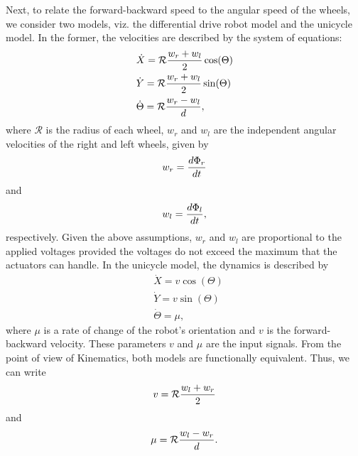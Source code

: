\documentclass[final,5p,times,twocolumn]{elsarticle}
\begin{document}
Next, to relate the forward-backward speed to the angular speed of the wheels, we consider two models, viz. the differential drive robot model and the unicycle model. In the former, the velocities are described by the system of equations:
\begin{equation}
\begin{split}
&\dot{X} = \mathcal{R}{w_r+w_l\over2}\cos(\Theta)\\
&\dot{Y} = \mathcal{R}{w_r+w_l\over2}\sin(\Theta)\\
&\dot{\Theta} = \mathcal{R}{w_r-w_l\over d},\label{ddrmodel}
\end{split}
\end{equation}
where $\mathcal{R}$ is the radius of each wheel, $w_{r}$ and $w_{l}$ are the independent angular velocities of the right and left wheels, given by
\begin{equation}
\begin{split}
w_{r} = {d\Phi_{r}\over dt}
\end{split}
\end{equation}
and 
\begin{equation}
\begin{split}
w_{l} = {d\Phi_{l}\over dt},
\end{split}
\end{equation}
respectively. Given the above assumptions, $w_{r}$ and $w_{l}$ are proportional to the applied voltages provided the voltages do not exceed the maximum that the actuators can handle. In the unicycle model, the dynamics is described by
\begin{equation}
\begin{split}
&\dot{X} = v\cos(\Theta)\\
&\dot{Y} = v\sin(\Theta)\\
&\dot{\Theta} = \mu,\label{unicycle}
\end{split}
\end{equation}
where $\mu$ is a rate of change of the robot's orientation and $v$ is the forward-backward velocity. These parameters $v$ and $\mu$ are the input signals.  From the point of view of Kinematics, both models are functionally equivalent. Thus, we can write 
\begin{equation}
v = \mathcal{R}{w_l+w_r\over2}
\end{equation}
and 
\begin{equation}
\mu = \mathcal{R}{w_l-w_r\over d}.
\end{equation}
\end{document}
